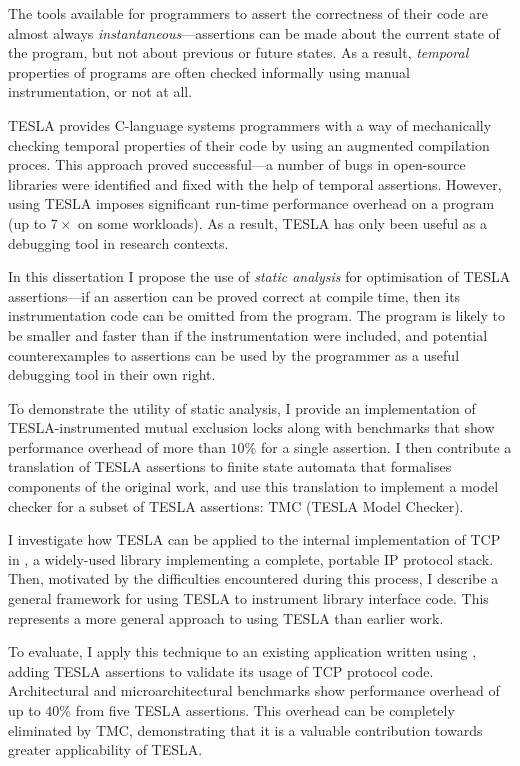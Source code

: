 The tools available for programmers to assert the correctness of their
code are almost always \emph{instantaneous}---assertions can be made
about the current state of the program, but not about previous or future
states. As a result, \emph{temporal} properties of programs are often
checked informally using manual instrumentation, or not at all.

TESLA \cite{anderson_tesla:_2014} provides C-language systems
programmers with a way of mechanically checking temporal properties of
their code by using an augmented compilation proces. This approach
proved successful---a number of bugs in open-source libraries were
identified and fixed with the help of temporal assertions. However,
using TESLA imposes significant run-time performance overhead on a
program (up to $7\times$ on some workloads). As a result, TESLA has only
been useful as a debugging tool in research contexts.

In this dissertation I propose the use of \emph{static analysis} for
optimisation of TESLA assertions---if an assertion can be proved correct
at compile time, then its instrumentation code can be omitted from the
program. The program is likely to be smaller and faster than if the
instrumentation were included, and potential counterexamples to
assertions can be used by the programmer as a useful debugging tool in
their own right.

To demonstrate the utility of static analysis, I provide an
implementation of TESLA-instrumented mutual exclusion locks along with
benchmarks that show performance overhead of more than $10\%$ for a
single assertion. I then contribute a translation of TESLA assertions to
finite state automata that formalises components of the original work,
and use this translation to implement a model checker for a subset of
TESLA assertions: TMC (TESLA Model Checker).

I investigate how TESLA can be applied to the internal implementation of
TCP in \lwip{} \cite{dunkels_design_2001}, a widely-used library
implementing a complete, portable IP protocol stack. Then, motivated by
the difficulties encountered during this process, I describe a general
framework for using TESLA to instrument library interface code. This
represents a more general approach to using TESLA than earlier work.

To evaluate, I apply this technique to an existing application written
using \lwip{}, adding TESLA assertions to validate its usage of TCP
protocol code.  Architectural and microarchitectural benchmarks show
performance overhead of up to $40\%$ from five TESLA assertions. This
overhead can be completely eliminated by TMC, demonstrating that it is a
valuable contribution towards greater applicability of TESLA.
